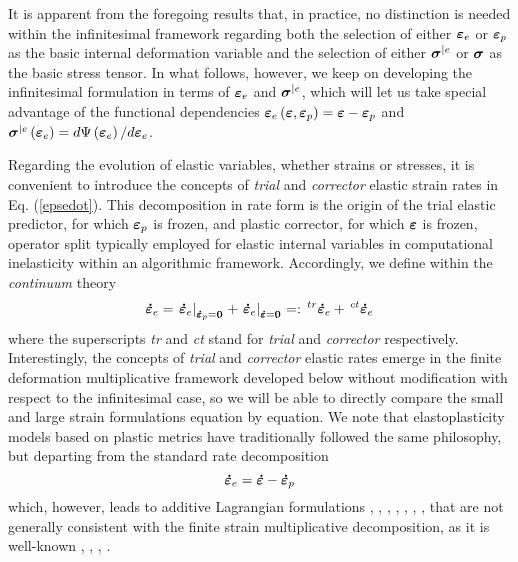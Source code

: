 \documentclass[preprint,review,12pt,sort&compress]{elsarticle}%
\newcommand{\epspdo}[0]{\scriptsize\mathbf{\dot \varepsilon}_p = \mathbf{0}\normalsize\mathbf{}}
\newcommand{\epsdo}[0]{\scriptsize\mathbf{\dot \varepsilon} = \mathbf{0}\normalsize\mathbf{}}
\renewcommand{\mathbf}[1]{\mbox{\boldmath $#1$ \unboldmath}  \!\!}
\begin{document}
It is apparent from the foregoing results that, in practice, no distinction is
needed within the infinitesimal framework regarding both the selection of
either $\mathbf{\varepsilon}_{e}$ or $\mathbf{\varepsilon}_{p}$ as the basic
internal deformation variable and the selection of either $\mathbf{\sigma
}^{|e}$ or $\mathbf{\sigma}$ as the basic stress tensor. In what follows,
however, we keep on developing the infinitesimal formulation in terms of
$\mathbf{\varepsilon}_{e}$ and $\mathbf{\sigma}^{|e}$, which will let us take
special advantage of the functional dependencies $\mathbf{\varepsilon}%
_{e}\left(  \mathbf{\varepsilon},\mathbf{\varepsilon}_{p}\right)
=\mathbf{\varepsilon}-\mathbf{\varepsilon}_{p}$ and $\mathbf{\sigma}%
^{|e}\left(  \mathbf{\varepsilon}_{e}\right)  =d\Psi\left(
\mathbf{\varepsilon}_{e}\right)  /d\mathbf{\varepsilon}_{e}$.

Regarding the evolution of elastic variables, whether strains or stresses, it
is convenient to introduce the concepts of \emph{trial} and \emph{corrector}
elastic strain rates in Eq. (\ref{epsedot}). This decomposition in rate form
is the origin of the trial elastic predictor, for which $\mathbf{\varepsilon
}_{p}$ is frozen, and plastic corrector, for which $\mathbf{\varepsilon}$ is
frozen, operator split typically employed for elastic internal variables in
computational inelasticity within an algorithmic framework. Accordingly, we
define within the \emph{continuum} theory%
\begin{equation}
\mathbf{\dot{\varepsilon}}_{e}=\left.  \mathbf{\dot{\varepsilon}}%
_{e}\right\vert _{%
\epspdo
}+\left.  \mathbf{\dot{\varepsilon}}_{e}\right\vert _{%
\epsdo
}=:\,^{tr}\mathbf{\dot{\varepsilon}}_{e}+\,^{ct}\mathbf{\dot{\varepsilon}}_{e}
\label{epsedot tr ct}%
\end{equation}
where the superscripts \emph{tr} and \emph{ct} stand for \emph{trial} and
\emph{corrector} respectively. Interestingly, the concepts of \emph{trial} and
\emph{corrector} elastic rates emerge in the finite deformation multiplicative
framework developed below without modification with respect to the
infinitesimal case, so we will be able to directly compare the small and large
strain formulations equation by equation. We note that elastoplasticity models
based on plastic metrics have traditionally followed the same philosophy, but
departing from the standard rate decomposition%
\begin{equation}
\mathbf{\dot{\varepsilon}}_{e}=\mathbf{\dot{\varepsilon}}-\mathbf{\dot
{\varepsilon}}_{p}%
\end{equation}
which, however, leads to additive Lagrangian formulations \cite{GreenNaghdi65}%
, \cite{Miehe98}, \cite{PapadopoulusLu98}, \cite{PapadopoulusLu01},
\cite{Miehe02}, \cite{LobleinSchroderGruttmann03}, \cite{SansourWagner03},
\cite{Ulz09} that are not generally consistent with the finite strain
multiplicative decomposition, as it is well-known \cite{GreenNaghdi71},
\cite{Itskov04}, \cite{Schmidt05}, \cite{NeffGhiba16}.
\end{document}
